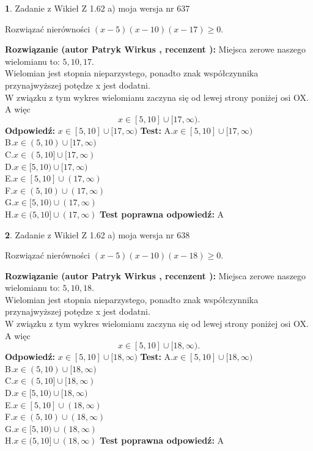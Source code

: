 \documentclass[12pt, a4paper]{article}
\theoremstyle{definition} %
\newtheorem{zad}{}
\newcommand{\zadStart}[1]{\begin{zad}#1\newline}
\newcommand{\zadStop}{\end{zad}}
\newcommand{\rozwStart}[2]{\noindent \textbf{Rozwiązanie (autor #1 , recenzent #2): }\newline}
\newcommand{\rozwStop}{\newline}
\newcommand{\odpStart}{\noindent \textbf{Odpowiedź:}\newline}
\newcommand{\odpStop}{\newline}
\newcommand{\testStart}{\noindent \textbf{Test:}\newline}
\newcommand{\testStop}{\newline}
\newcommand{\kluczStart}{\noindent \textbf{Test poprawna odpowiedź:}\newline}
\newcommand{\kluczStop}{\newline}
\begin{document}
\zadStart{Zadanie z Wikieł Z 1.62 a) moja wersja nr 637}

Rozwiązać nierówności $(x-5)(x-10)(x-17)\ge0$.
\zadStop
\rozwStart{Patryk Wirkus}{}
Miejsca zerowe naszego wielomianu to: $5, 10, 17$.\\
Wielomian jest stopnia nieparzystego, ponadto znak współczynnika przy\linebreak najwyższej potędze x jest dodatni.\\ W związku z tym wykres wielomianu zaczyna się od lewej strony poniżej osi OX. A więc $$x \in [5,10] \cup [17,\infty).$$
\rozwStop
\odpStart
$x \in [5,10] \cup [17,\infty)$
\odpStop
\testStart
A.$x \in [5,10] \cup [17,\infty)$\\
B.$x \in (5,10) \cup [17,\infty)$\\
C.$x \in (5,10] \cup [17,\infty)$\\
D.$x \in [5,10) \cup [17,\infty)$\\
E.$x \in [5,10] \cup (17,\infty)$\\
F.$x \in (5,10) \cup (17,\infty)$\\
G.$x \in [5,10) \cup (17,\infty)$\\
H.$x \in (5,10] \cup (17,\infty)$
\testStop
\kluczStart
A
\kluczStop



\zadStart{Zadanie z Wikieł Z 1.62 a) moja wersja nr 638}

Rozwiązać nierówności $(x-5)(x-10)(x-18)\ge0$.
\zadStop
\rozwStart{Patryk Wirkus}{}
Miejsca zerowe naszego wielomianu to: $5, 10, 18$.\\
Wielomian jest stopnia nieparzystego, ponadto znak współczynnika przy\linebreak najwyższej potędze x jest dodatni.\\ W związku z tym wykres wielomianu zaczyna się od lewej strony poniżej osi OX. A więc $$x \in [5,10] \cup [18,\infty).$$
\rozwStop
\odpStart
$x \in [5,10] \cup [18,\infty)$
\odpStop
\testStart
A.$x \in [5,10] \cup [18,\infty)$\\
B.$x \in (5,10) \cup [18,\infty)$\\
C.$x \in (5,10] \cup [18,\infty)$\\
D.$x \in [5,10) \cup [18,\infty)$\\
E.$x \in [5,10] \cup (18,\infty)$\\
F.$x \in (5,10) \cup (18,\infty)$\\
G.$x \in [5,10) \cup (18,\infty)$\\
H.$x \in (5,10] \cup (18,\infty)$
\testStop
\kluczStart
A
\kluczStop
\end{document}
